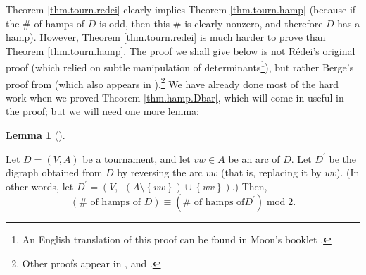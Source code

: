 \documentclass[numbers=enddot,12pt,final,onecolumn,notitlepage]{scrartcl}%
\numberwithin{exer}{subsection}
\theoremstyle{definition}
\newtheorem{lem}[theo]{Lemma}
\newenvironment{lemma}[1][]
{\begin{lem}[#1]\begin{leftbar}}
{\end{leftbar}\end{lem}}
\begin{document}
Theorem \ref{thm.tourn.redei} clearly implies Theorem \ref{thm.tourn.hamp}
(because if the $\#$ of hamps of $D$ is odd, then this $\#$ is clearly
nonzero, and therefore $D$ has a hamp). However, Theorem \ref{thm.tourn.redei}
is much harder to prove than Theorem \ref{thm.tourn.hamp}. The proof we shall
give below is not R\'{e}dei's original proof (which relied on subtle
manipulation of determinants\footnote{An English translation of this proof can
be found in Moon's booklet \cite[proof of Theorem 14]{Moon13}.}), but rather
Berge's proof from \cite[\S 10.2, Theorem 6]{Berge91} (which also appears in
\cite[solution to problem 7.8]{Tomesc85}).\footnote{Other proofs appear in
\cite[Corollaire 5.1]{Lass02}, \cite{GriSta23} and \cite{IrvOma25}.} We have
already done most of the hard work when we proved Theorem \ref{thm.hamp.Dbar},
which will come in useful in the proof; but we will need one more lemma:

\begin{lemma}
\label{lem.tourn.reverse}Let $D=\left(  V,A\right)  $ be a tournament, and let
$vw\in A$ be an arc of $D$. Let $D^{\prime}$ be the digraph obtained from $D$
by reversing the arc $vw$ (that is, replacing it by $wv$). (In other words,
let $D^{\prime}=\left(  V,\ \ \left(  A\setminus\left\{  vw\right\}  \right)
\cup\left\{  wv\right\}  \right)  $.) Then,%
\[
\left(  \#\text{ of hamps of }D\right)  \equiv\left(  \#\text{ of hamps of
}D^{\prime}\right)  \operatorname{mod}2.
\]

\end{lemma}
\end{document}
